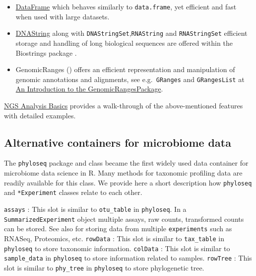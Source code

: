 \documentclass[
]{book}
\providecommand{\tightlist}{%
  \setlength{\itemsep}{0pt}\setlength{\parskip}{0pt}}
\begin{document}
\begin{itemize}
\tightlist
\item
  \href{https://rdrr.io/bioc/S4Vectors/man/DataFrame-class.html}{DataFrame} which behaves similarly to \texttt{data.frame}, yet efficient and fast when used with large datasets.
\item
  \href{https://rdrr.io/bioc/Biostrings/man/DNAString-class.html}{DNAString} along with \texttt{DNAStringSet},\texttt{RNAString} and \texttt{RNAStringSet} efficient storage and handling of long biological sequences are offered within the Biostrings package \citep{R-Biostrings}.
\item
  GenomicRanges (\citep{GenomicRanges2013}) offers an efficient representation and manipulation of genomic annotations and alignments, see e.g.~\texttt{GRanges} and \texttt{GRangesList} at \href{https://bioconductor.org/packages/release/bioc/vignettes/GenomicRanges/inst/doc/GenomicRangesIntroduction.html}{An Introduction to the GenomicRangesPackage}.
\end{itemize}

\href{http://girke.bioinformatics.ucr.edu/GEN242/tutorials/rsequences/rsequences/}{NGS Analysis Basics} provides a walk-through of the above-mentioned features with detailed examples.

\hypertarget{alternative-containers-for-microbiome-data}{%
\subsection{Alternative containers for microbiome data}\label{alternative-containers-for-microbiome-data}}

The \texttt{phyloseq} package and class became the first widely used data
container for microbiome data science in R. Many methods for taxonomic
profiling data are readily available for this class. We provide here a
short description how \texttt{phyloseq} and \texttt{*Experiment} classes relate to
each other.

\texttt{assays} : This slot is similar to \texttt{otu\_table} in \texttt{phyloseq}. In a
\texttt{SummarizedExperiment} object multiple assays, raw
counts, transformed counts can be stored. See also
\citep{Ramos2017}
for storing data from multiple \texttt{experiments} such as
RNASeq, Proteomics, etc. \texttt{rowData} : This slot is
similar to \texttt{tax\_table} in \texttt{phyloseq} to store taxonomic
information. \texttt{colData} : This slot is similar to
\texttt{sample\_data} in \texttt{phyloseq} to store information
related to samples. \texttt{rowTree} : This slot is similar
to \texttt{phy\_tree} in \texttt{phyloseq} to store phylogenetic tree.
\end{document}
